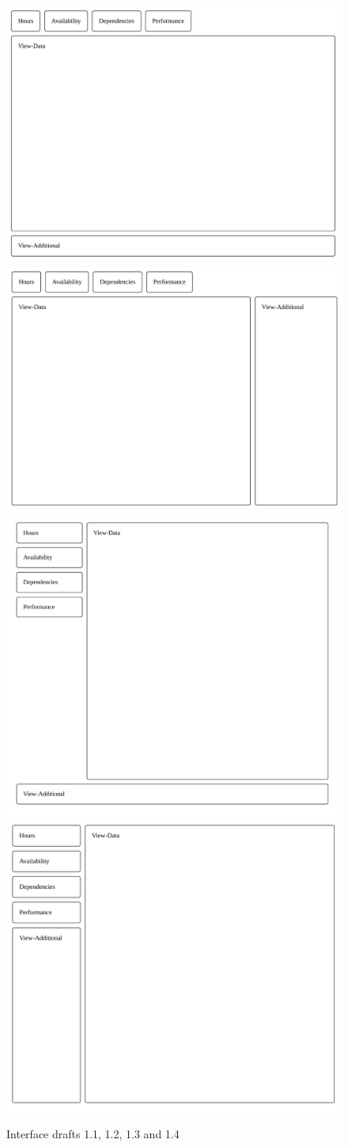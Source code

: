 {    \begin{figure}[h!]
      \center
      \includegraphics[valign=t,trim={.10cm .10cm .35cm .25cm},clip,width=.49\linewidth]{ui11.pdf}
      \includegraphics[valign=t,trim={.15cm .30cm .20cm .20cm},clip,width=.49\linewidth]{ui12.pdf}
      \includegraphics[valign=t,trim={.45cm .55cm .65cm .35cm},clip,width=.49\linewidth]{ui13.pdf}
      \includegraphics[valign=t,trim={.25cm .35cm .30cm .25cm},clip,width=.49\linewidth]{ui14.pdf}
      \caption{Interface drafts 1.1, 1.2, 1.3 and 1.4}
      \label{label_mockupInterfaces}
    \end{figure}

}
